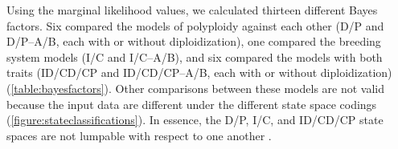 Using the marginal likelihood values, we calculated thirteen different Bayes factors. %
Six compared the models of polyploidy against each other (D/P and D/P--A/B, each with or without diploidization), one compared the breeding system models (I/C and I/C--A/B), and six compared the models with both traits (ID/CD/CP and ID/CD/CP--A/B, each with or without diploidization) (\cref{table:bayesfactors}).
%
Other comparisons between these models are not valid because the input data are different under the different state space codings (\cref{figure:stateclassifications}).
In essence, the D/P, I/C, and ID/CD/CP state spaces are not lumpable with respect to one another \citep{tarasov_2019}.


